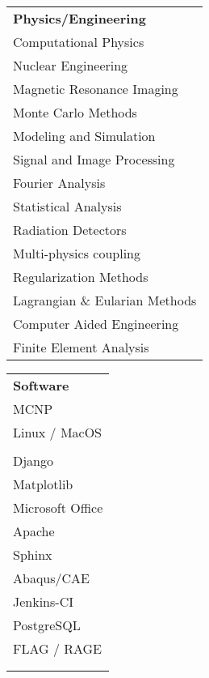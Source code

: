 
\begin{minipage}{0.31\textwidth}
\begin{tabular}{l}
	{\large\textbf{Physics/Engineering}} \\
	\highskillbw Computational Physics \\
	\highskillbw Nuclear Engineering \\
	\highskillbw Magnetic Resonance Imaging \\ 
	\highskillbw Monte Carlo Methods \\
	\highskillbw Modeling and Simulation \\
	\highskillbw Signal and Image Processing \\
	\highskillbw Fourier Analysis \\ 
	\medskillbw Statistical Analysis \\
	\medskillbw Radiation Detectors \\
	\medskillbw Multi-physics coupling \\
	\medskillbw Regularization Methods  \\
	\medskillbw Lagrangian \& Eularian Methods \\
	\lowskillbw Computer Aided Engineering \\
	\lowskillbw Finite Element Analysis \\
\end{tabular}
\end{minipage}%
\begin{minipage}{0.18\textwidth}
	\begin{center}
\begin{tabular}{l}
	{\large\textbf{Software}} \\
	\highskillbw \textsc{MCNP} \\
	\highskillbw Linux / MacOS \\ 
	\highskillbw {\fontfamily{ptm}\selectfont \LaTeX} \\ 
	\highskillbw Django  \\
	\highskillbw Matplotlib \\ 
	\highskillbw Microsoft Office \\
	\medskillbw Apache \\
	\medskillbw Sphinx  \\
	\medskillbw Abaqus/CAE \\
	\medskillbw Jenkins-CI \\
	\medskillbw PostgreSQL \\
	\lowskillbw FLAG / RAGE \\
	\\
	\\
\end{tabular}
	\end{center}
\end{minipage}%
